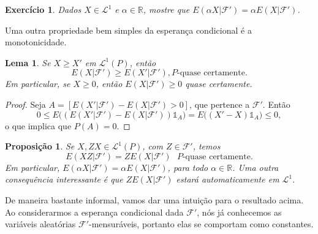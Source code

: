 \documentclass[reqno, final]{book}
\newcommand*\1{\mathds{1}}
\newtheorem{lemma}[theorem]{Lema}
\newtheorem{proposition}[theorem]{Proposição}
\newtheorem{exercise}[example]{Exercício}
\begin{document}
\begin{exercise}
  Dados $X \in \mathcal{L}^1$ e $\alpha \in \mathbb{R}$, mostre que $E(\alpha X|\mathcal{F}') = \alpha E(X|\mathcal{F}')$.
\end{exercise}

Uma outra propriedade bem simples da esperança condicional é a monotonicidade.

\begin{lemma}
  \label{l:ec_mono}
  Se $X \geq X'$ em $\mathcal{L}^1(P)$, então
  \begin{equation}
    E(X|\mathcal{F}') \geq E(X'|\mathcal{F}'), \text{$P$-quase certamente.}
  \end{equation}
  Em particular, se $X \geq 0$, então $E(X|\mathcal{F}') \geq 0$ quase certamente.
\end{lemma}

\begin{proof}
  Seja $A = [E(X'|\mathcal{F}') - E(X|\mathcal{F}') > 0]$, que pertence a $\mathcal{F}'$.
  Então
  \begin{equation}
    0 \leq E\big( (E(X'|\mathcal{F}') - E(X|\mathcal{F}')) \1_A \big) = E\big((X' - X) \1_A\big) \leq 0,
  \end{equation}
  o que implica que $P(A) = 0$.
\end{proof}



\begin{proposition}
  \label{p:EZX_ZEX}
  Se $X, ZX \in \mathcal{L}^1(P)$, com $Z \in \mathcal{F}'$, temos
  \begin{equation}
    E(XZ|\mathcal{F}') = Z E(X|\mathcal{F}') \text{ $P$-quase certamente}.
  \end{equation}
  Em particular, $E(\alpha X|\mathcal{F}') = \alpha E(X|\mathcal{F}')$, para todo $\alpha \in \mathbb{R}$.
  Uma outra consequência interessante é que $Z E(X|\mathcal{F}')$ estará automaticamente em $\mathcal{L}^1$.
\end{proposition}

De maneira bastante informal, vamos dar uma intuição para o resultado acima.
Ao considerarmos a esperança condicional dada $\mathcal{F}'$, nós já conhecemos as variáveis aleatórias $\mathcal{F}'$-mensuráveis, portanto elas se comportam como constantes.
\end{document}
